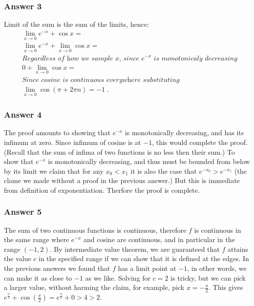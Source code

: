 \documentclass[a4paper]{article}
\begin{document}
\subsubsection{Answer 3}
\label{sec:orgheadline4}
Limit of the sum is the sum of the limits, hence:
\begin{align*}
  &\lim_{x \to 0} e^{-x} + \cos x = \\
  & \lim_{x \to 0} e^{-x} + \lim_{x \to 0} \cos x = \\
  &\textit{Regardless of how we sample x, since $e^{-x}$ is monotonicaly decreasing} \\
  &0 + \lim_{x \to 0} \cos x = \\
  &\textit{Since cosine is continuous everywhere substituting} \\
  &\lim_{x \to 0} \cos(\pi + 2\pi n) = -1\;.
\end{align*}

\subsubsection{Answer 4}
\label{sec:orgheadline5}
The proof amounts to showing that \(e^{-x}\) is monotonically decreasing, and
has its infimum at zero.  Since infimum of cosine is at \(-1\), this would complete
the proof.  (Recall that the sum of infima of two functions is no less then
their sum.)  To show that \(e^{-x}\) is monotonically decreasing, and thus must
be bounded from below by its limit we claim that for any \(x_0 < x_1\) it is also
the case that \(e^{-x_0} > e^{-x_1}\) (the clame we made without a proof in the
previous answer.)  But this is immediate from definition of exponentiation.
Therfore the proof is complete.

\subsubsection{Answer 5}
\label{sec:orgheadline6}
The sum of two continuous functions is continuous, therefore \(f\) is
continuous in the same range where \(e^{-x}\) and cosine are continuous, and
in particular in the range \((-1, 2)\).  By intermediate value theorem, we are
guaranteed that \(f\) attains the value \(c\) in the specified range if we can
show that it is defined at the edges.  In the previous answers we found that
\(f\) has a limit point at \(-1\), in other words, we can make it as close to
\(-1\) as we like.  Solving for \(c = 2\) is tricky, but we can pick a larger
value, without harming the claim, for example, pick \(x = -\frac{\pi}{2}\).
This gives \(e^{\frac{\pi}{2}} + \cos(\frac{\pi}{2}) = e^{\frac{\pi}{2}} + 0
    > 4 > 2\).
\end{document}
